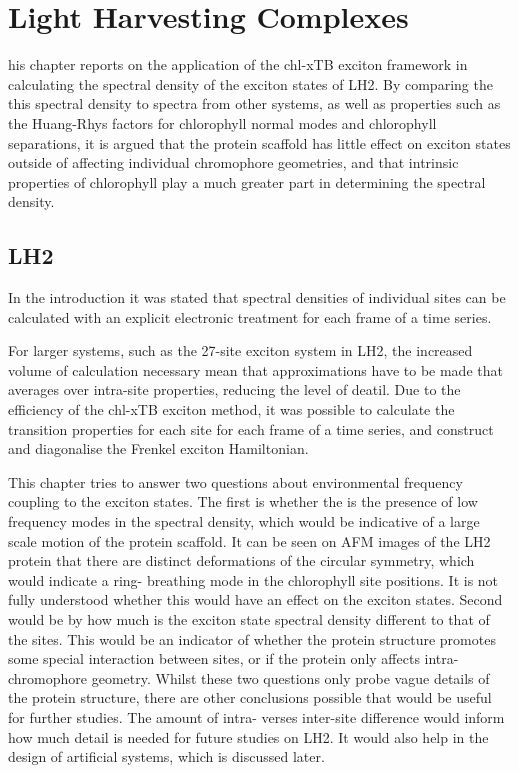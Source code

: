 %
%
\let\textcircled=\pgftextcircled
\chapter{Light Harvesting Complexes}
\label{chap:LH2}

his chapter reports on the application of the chl-xTB exciton framework
in calculating the spectral density of the exciton states of LH2. By comparing the
this spectral density to spectra from other systems, as well as properties such
as the Huang-Rhys factors for chlorophyll normal modes and chlorophyll separations,
it is argued that the protein scaffold has little effect on exciton states outside
of affecting individual chromophore geometries, and that intrinsic properties of
chlorophyll play a much greater part in determining the spectral density.

\section{LH2}
\label{sec:LH2}

In the introduction it was stated that spectral densities of individual sites can
be calculated with an explicit electronic treatment for each frame of a time series.

For larger systems, such as the 27-site exciton system in LH2, the increased volume
of calculation necessary mean that approximations have to be made that averages
over intra-site properties, reducing the level of deatil. Due to the efficiency
of the chl-xTB exciton method, it was possible to calculate the transition properties
for each site for each frame of a time series, and construct and diagonalise the
Frenkel exciton Hamiltonian.

This chapter tries to answer two questions about environmental frequency coupling
to the exciton states. The first is whether the is the presence of low frequency
modes in the spectral density, which would be indicative of a large scale motion
of the protein scaffold. It can be seen on AFM images of the LH2 protein that there
are distinct deformations of the circular symmetry, which would indicate a ring-
breathing mode in the chlorophyll site positions. It is not fully understood whether
this would have an effect on the exciton states. Second would be by how much is 
the exciton state spectral density different to that of the sites. This would be
an indicator of whether the protein structure promotes some special interaction 
between sites, or if the protein only affects intra-chromophore geometry. Whilst
these two questions only probe vague details of the protein structure, there are
other conclusions possible that would be useful for further studies. The amount 
of intra- verses inter-site difference would inform how much detail is needed for
future studies on LH2. It would also help in the design of artificial systems, which
is discussed later.

